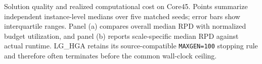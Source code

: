 \caption{Solution quality and realized computational cost on Core45. Points summarize independent instance-level medians over five matched seeds; error bars show interquartile ranges. Panel (a) compares overall median RPD with normalized budget utilization, and panel (b) reports scale-specific median RPD against actual runtime. LG\_HGA retains its source-compatible \texttt{MAXGEN=100} stopping rule and therefore often terminates before the common wall-clock ceiling.}
